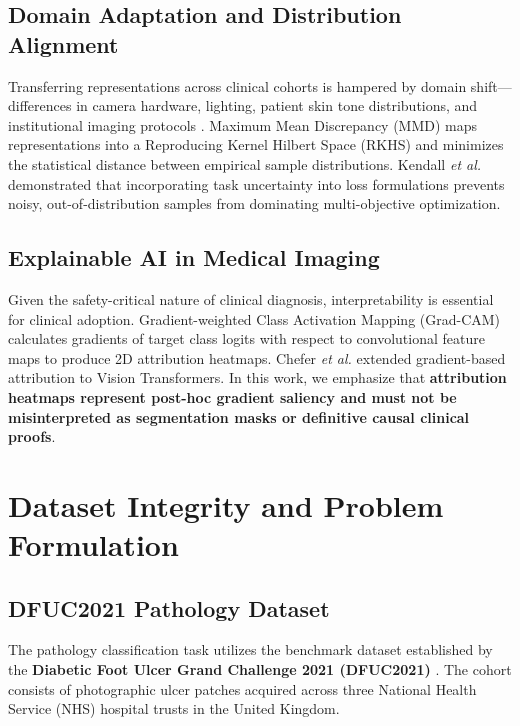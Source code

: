 \documentclass[journal]{IEEEtran}
\begin{document}
\subsection{Domain Adaptation and Distribution Alignment}
Transferring representations across clinical cohorts is hampered by domain shift---differences in camera hardware, lighting, patient skin tone distributions, and institutional imaging protocols \cite{yap2022development}. Maximum Mean Discrepancy (MMD) \cite{gretton2012kernel, long2015learning} maps representations into a Reproducing Kernel Hilbert Space (RKHS) and minimizes the statistical distance between empirical sample distributions. Kendall \textit{et al.} \cite{kendall2018multi} demonstrated that incorporating task uncertainty into loss formulations prevents noisy, out-of-distribution samples from dominating multi-objective optimization.

\subsection{Explainable AI in Medical Imaging}
Given the safety-critical nature of clinical diagnosis, interpretability is essential for clinical adoption. Gradient-weighted Class Activation Mapping (Grad-CAM) \cite{selvaraju2017grad} calculates gradients of target class logits with respect to convolutional feature maps to produce 2D attribution heatmaps. Chefer \textit{et al.} \cite{chefer2021transformer} extended gradient-based attribution to Vision Transformers. In this work, we emphasize that \textbf{attribution heatmaps represent post-hoc gradient saliency and must not be misinterpreted as segmentation masks or definitive causal clinical proofs}.

\section{Dataset Integrity and Problem Formulation}

\subsection{DFUC2021 Pathology Dataset}
The pathology classification task utilizes the benchmark dataset established by the \textbf{Diabetic Foot Ulcer Grand Challenge 2021 (DFUC2021)} \cite{cassidy2021diabetic}. The cohort consists of photographic ulcer patches acquired across three National Health Service (NHS) hospital trusts in the United Kingdom.
\end{document}
